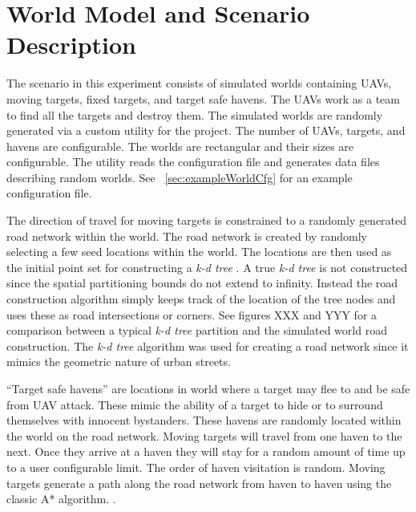\chapter{World Model and Scenario Description}

The scenario in this experiment consists of simulated worlds containing UAVs, moving targets, fixed targets, and target safe havens.  The UAVs work as a team to find all the targets and destroy them.  The simulated worlds are randomly generated via a custom utility for the project.  The number of UAVs, targets, and havens are configurable.  The worlds are rectangular and their sizes are configurable.  The utility reads the configuration file and generates data files describing random worlds.  See ~\ref{sec:exampleWorldCfg} for an example configuration file.

The direction of travel for moving targets is constrained to a randomly generated road network within the world.  The road network is created by randomly selecting a few seed locations within the world.  The locations are then used as the initial point set for constructing a \textit{k-d tree} .  A true \textit{k-d tree} is not constructed since the spatial partitioning bounds do not extend to infinity.  Instead the road construction algorithm simply keeps track of the location of the tree nodes and uses these as road intersections or corners.  See figures XXX and YYY  for a comparison between a typical \textit{k-d tree} partition and the simulated world road construction.  The \textit{k-d tree} algorithm was used for creating a road network since it mimics the geometric nature of urban streets. 



``Target safe havens'' are locations in world where a target may flee to and be safe from UAV attack.  These mimic the ability of a target to hide or to surround themselves with innocent bystanders.  These havens are randomly located within the world on the road network.  Moving targets will travel from one haven to the next.  Once they arrive at a haven they will stay for a random amount of time up to a user configurable limit.  The order of haven visitation is random.  Moving targets generate a path along the road network from haven to haven using the classic A* algorithm. .

